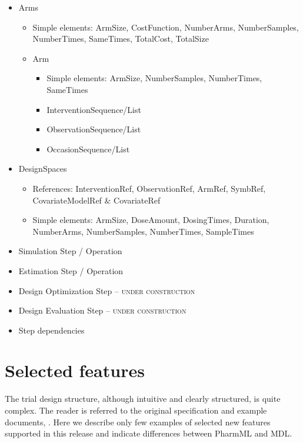 \begin{minipage}{0.6\textwidth}
\begin{flushright}
\begin{itemize}
\item 
Arms
\begin{itemize}
\item 
Simple elements: ArmSize, CostFunction, NumberArms, NumberSamples, NumberTimes, SameTimes, TotalCost, TotalSize
\item 
Arm
\begin{itemize}
\item 
Simple elements: ArmSize, NumberSamples, NumberTimes, SameTimes
\item 
InterventionSequence/List
\item 
ObservationSequence/List
\item 
OccasionSequence/List
\end{itemize}
\end{itemize}
\item 
DesignSpaces
\begin{itemize}
\item 
References: InterventionRef, ObservationRef, ArmRef, SymbRef, CovariateModelRef \& CovariateRef
\item 
Simple elements: ArmSize, DoseAmount, DosingTimes, Duration, NumberArms, NumberSamples, NumberTimes, SampleTimes
\end{itemize}
\end{itemize}
\end{flushright}
{\color{red} \scshape{}}
\begin{flushleft} 
\begin{itemize}
\item 
Simulation Step / Operation
\item 
Estimation Step / Operation
\item 
Design Optimization Step -- {\color{darkgreen} \scshape{under construction}} 
\item 
Design Evaluation Step -- {\color{darkgreen} \scshape{under construction}}
\item 
Step dependencies
\end{itemize}
\end{flushleft}
\label{miniPage:comparison}
\end{minipage}



\section{Selected features}
The trial design structure, although intuitive and clearly structured,
is quite complex. The reader is referred to the original specification 
and example documents, \cite{CommetsExamples2015,Commets2015}.
Here we describe only few examples of selected new features supported in this 
release and indicate differences between PharmML and MDL.

